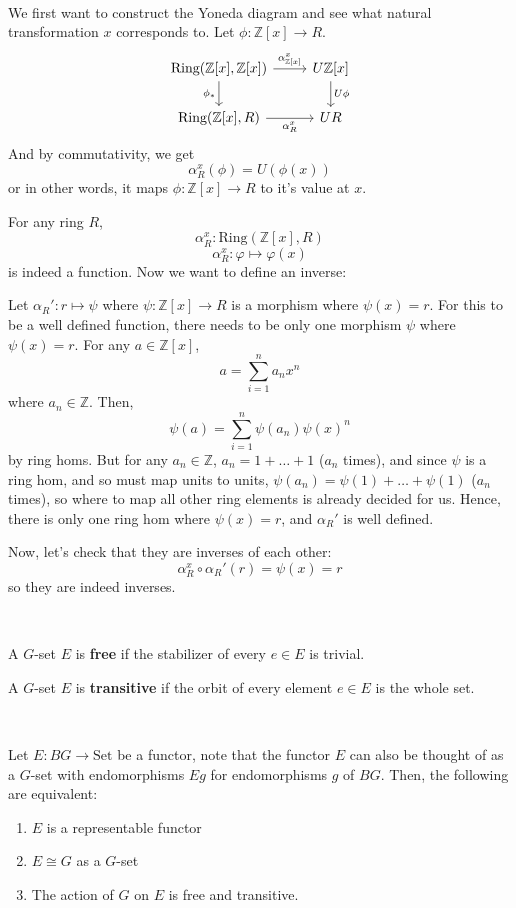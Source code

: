 \documentclass{article}
\begin{document}
\begin{customproof}
\

We first want to construct the Yoneda diagram and see what natural transformation $x$ corresponds to. Let $\phi: \mathbb{Z}[x] \to R$. \[\begin{tikzcd}
	\text{Ring}(\mathbb{Z}[x], \mathbb{Z}[x]) & U \mathbb{Z}[x]\\
	\text{Ring}(\mathbb{Z}[x], R) & UR
	\arrow[from=1-1, to=1-2, "\alpha^x_{\mathbb{Z}[x]}"]
	\arrow[from=1-1, to=2-1, "\phi_*"']
	\arrow[from=2-1, to=2-2, "\alpha^x_R"']
	\arrow[from=1-2, to=2-2, "U\phi"]
\end{tikzcd}\]And by commutativity, we get $$\alpha^x_R(\phi) = U(\phi(x))$$or in other words, it maps $\phi: \mathbb{Z}[x] \to R$ to it's value at $x$. 

For any ring $R$, $$\alpha_R^x: \text{Ring}(\mathbb{Z}[x], R)$$ $$\alpha_R^x: \varphi \mapsto \varphi(x)$$ is indeed a function. Now we want to define an inverse:

Let $\alpha_R': r \mapsto \psi$ where $\psi: \mathbb{Z}[x] \to R$ is a morphism where $\psi(x) = r$. For this to be a well defined function, there needs to be only one morphism $\psi$ where $\psi(x) = r$. For any $a \in \mathbb{Z}[x]$, $$a = \sum_{i=1}^n a_n x^n$$where $a_n \in \mathbb{Z}$. Then, $$\psi(a) = \sum_{i=1}^n \psi(a_n)\psi(x)^n$$by ring homs. But for any $a_n \in \mathbb{Z}$, $a_n = 1 + \dots + 1$ ($a_n$ times), and since $\psi$ is a ring hom, and so must map units to units, $\psi(a_n) = \psi(1) + \dots + \psi(1)$ ($a_n$ times), so where to map all other ring elements is already decided for us. Hence, there is only one ring hom where $\psi(x) = r$, and $\alpha_R'$ is well defined. 

Now, let's check that they are inverses of each other: $$\alpha^x_R \circ \alpha_R' (r) = \psi(x) = r$$so they are indeed inverses.
\end{customproof}

\begin{definition}
\

A $G$-set $E$ is \textbf{free} if the stabilizer of every $e \in E$ is trivial. 

A $G$-set $E$ is \textbf{transitive} if the orbit of every element $e \in E$ is the whole set. 
\end{definition}

\begin{proposition}
\

Let $E: BG \to \text{Set}$ be a functor, note that the functor $E$ can also be thought of as a $G$-set with endomorphisms $Eg$ for endomorphisms $g$ of $BG$. Then, the following are equivalent:

\begin{enumerate}
	\item $E$ is a representable functor
	\item $E \cong G$ as a $G$-set
	\item The action of $G$ on $E$ is free and transitive. 
\end{enumerate}
\end{proposition}
\end{document}
